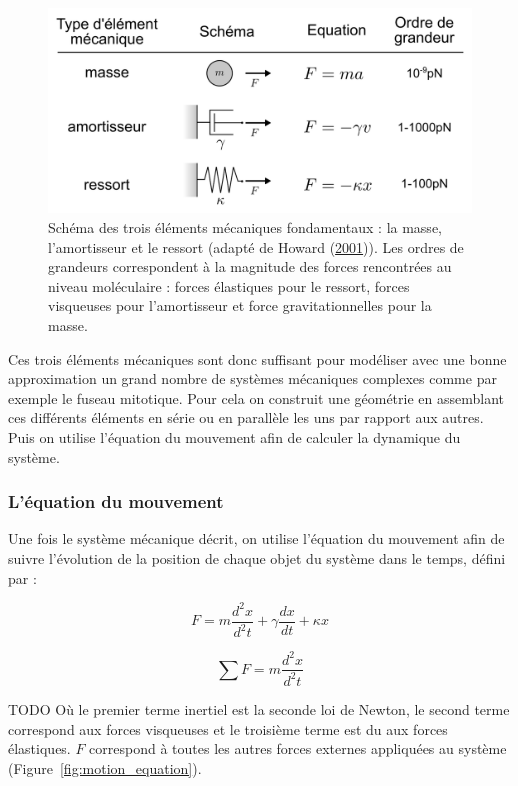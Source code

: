 \documentclass[12pt,a4paper,twoside,openright]{book}
\begin{document}
\begin{figure}[htbp]
\centering
\includegraphics{figures/intro/force_types.png}
\caption{\label{fig:force_types}Schéma des trois éléments mécaniques
fondamentaux : la masse, l'amortisseur et le ressort (adapté de Howard
(\protect\hyperlink{ref-Howard2001}{2001})). Les ordres de grandeurs
correspondent à la magnitude des forces rencontrées au niveau
moléculaire : forces élastiques pour le ressort, forces visqueuses pour
l'amortisseur et force gravitationnelles pour la masse.}
\end{figure}

Ces trois éléments mécaniques sont donc suffisant pour modéliser avec
une bonne approximation un grand nombre de systèmes mécaniques complexes
comme par exemple le fuseau mitotique. Pour cela on construit une
géométrie en assemblant ces différents éléments en série ou en parallèle
les uns par rapport aux autres. Puis on utilise l'équation du mouvement
afin de calculer la dynamique du système.

\subsubsection{L'équation du mouvement}\label{luxe9quation-du-mouvement}

Une fois le système mécanique décrit, on utilise l'équation du mouvement
afin de suivre l'évolution de la position de chaque objet du système
dans le temps, défini par :

\[
F = m\frac{d^2x}{d^2t} + \gamma\frac{dx}{dt} + \kappa x
\]

\[
\sum F = m\frac{d^2x}{d^2t}
\]

TODO Où le premier terme inertiel est la seconde loi de Newton, le
second terme correspond aux forces visqueuses et le troisième terme est
du aux forces élastiques. \(F\) correspond à toutes les autres forces
externes appliquées au système (Figure~\ref{fig:motion_equation}).
\end{document}
